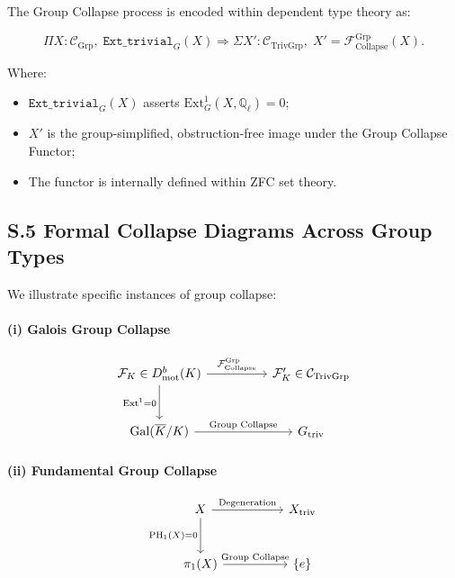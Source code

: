 \documentclass[11pt]{article}
\begin{document}
The Group Collapse process is encoded within dependent type theory as:

\[
\Pi X : \mathcal{C}_{\mathrm{Grp}},\;
\texttt{Ext\_trivial}_G(X)
\Rightarrow
\Sigma X' : \mathcal{C}_{\mathrm{TrivGrp}},\;
X' = \mathcal{F}_{\mathrm{Collapse}}^{\mathrm{Grp}}(X).
\]

Where:
\begin{itemize}
    \item $\texttt{Ext\_trivial}_G(X)$ asserts $\mathrm{Ext}^1_G(X, \mathbb{Q}_\ell) = 0$;
    \item $X'$ is the group-simplified, obstruction-free image under the Group Collapse Functor;
    \item The functor is internally defined within ZFC set theory.
\end{itemize}

\subsection*{S.5 Formal Collapse Diagrams Across Group Types}

We illustrate specific instances of group collapse:

\paragraph{(i) Galois Group Collapse}

\[
\begin{tikzcd}[column sep=huge, row sep=large]
\mathcal{F}_K \in D^b_{\mathrm{mot}}(K) \arrow[r, "{\mathcal{F}_{\mathrm{Collapse}}^{\mathrm{Grp}}}"] \arrow[d, swap, "{\mathrm{Ext}^1 = 0}"]
& \mathcal{F}_K' \in \mathcal{C}_{\mathrm{TrivGrp}} \\
\mathrm{Gal}(\overline{K}/K) \arrow[r, "{\text{Group Collapse}}"]
& G_{\mathrm{triv}}
\end{tikzcd}
\]

\paragraph{(ii) Fundamental Group Collapse}

\[
\begin{tikzcd}[column sep=huge, row sep=large]
X \arrow[r, "{\mathrm{Degeneration}}"] \arrow[d, swap, "{\mathrm{PH}_1(X) = 0}"]
& X_{\mathrm{triv}} \\
\pi_1(X) \arrow[r, "{\text{Group Collapse}}"]
& \{e\}
\end{tikzcd}
\]
\end{document}
